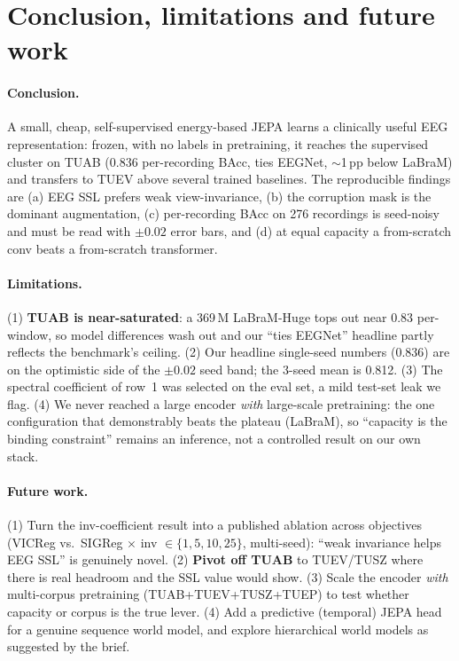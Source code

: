 \documentclass[10pt,a4paper]{article}
\begin{document}
\section{Conclusion, limitations and future work}
\label{sec:conclusion}

\paragraph{Conclusion.} A small, cheap, self-supervised energy-based JEPA learns a clinically useful EEG
representation: frozen, with no labels in pretraining, it reaches the supervised cluster on TUAB (0.836
per-recording BAcc, ties EEGNet, $\sim$1\,pp below LaBraM) and transfers to TUEV above several trained
baselines. The reproducible findings are (a) EEG SSL prefers weak view-invariance, (b) the
corruption mask is the dominant augmentation, (c) per-recording BAcc on 276 recordings is seed-noisy and must
be read with $\pm0.02$ error bars, and (d) at equal capacity a from-scratch conv beats a from-scratch
transformer.

\paragraph{Limitations.} (1) \textbf{TUAB is near-saturated}: a 369\,M LaBraM-Huge tops out near 0.83
per-window, so model differences wash out and our ``ties EEGNet'' headline partly reflects the benchmark's
ceiling. (2) Our headline single-seed numbers (0.836) are on the optimistic side of the $\pm0.02$ seed band;
the 3-seed mean is 0.812. (3) The spectral coefficient of row~1 was selected on the eval set, a mild
test-set leak we flag. (4) We never reached a large encoder \emph{with} large-scale pretraining: the one
configuration that demonstrably beats the plateau (LaBraM), so ``capacity is the binding constraint''
remains an inference, not a controlled result on our own stack.

\paragraph{Future work.} (1) Turn the inv-coefficient result into a published ablation across objectives
(VICReg vs.\ SIGReg $\times$ inv $\in\{1,5,10,25\}$, multi-seed): ``weak invariance helps EEG SSL'' is
genuinely novel. (2) \textbf{Pivot off TUAB} to TUEV/TUSZ where there is real headroom and the SSL value
would show. (3) Scale the encoder \emph{with} multi-corpus pretraining (TUAB+TUEV+TUSZ+TUEP) to test whether
capacity or corpus is the true lever. (4) Add a predictive (temporal) JEPA head~\cite{vjepa} for a genuine
sequence world model, and explore hierarchical world models as suggested by the brief.



\end{document}
